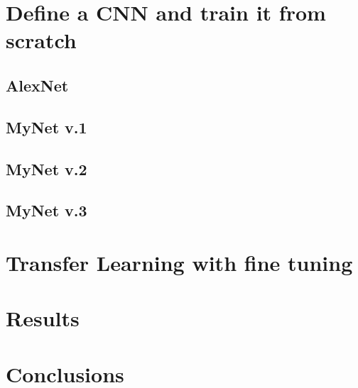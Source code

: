 \documentclass[11pt]{article}
\begin{document}
\section{Define a CNN and train it from scratch}
\subsection{AlexNet}


\subsection{MyNet v.1}


\subsection{MyNet v.2}


\subsection{MyNet v.3}


\section{Transfer Learning with fine tuning}


\section{Results}


\section{Conclusions}
\end{document}
